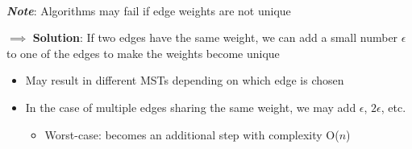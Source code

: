 \documentclass[12pt]{extarticle}
\theoremstyle{definition}
\theoremstyle{remark}
\begin{document}
~\\
\textbf{\textit{Note}}: Algorithms may fail if edge weights are not unique

\vspace{3pt}
\noindent $\implies$ \textbf{Solution}: If two edges have the same weight, we can add a small number $\epsilon$ to one of the edges to make the weights become unique \begin{itemize}
    \item May result in different MSTs depending on which edge is chosen
    \item In the case of multiple edges sharing the same weight, we may add $\epsilon$, $2\epsilon$, etc. \begin{itemize}
        \item Worst-case: becomes an additional step with complexity O($n$)
    \end{itemize}
\end{itemize}
\end{document}
